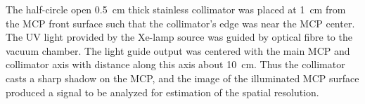 \documentclass[preprint,3p,twocolumn]{elsarticle}
\begin{document}
The half-circle open \SI{.5}{\cm} thick stainless collimator was
placed at \SI{1}{\cm} from the MCP front surface such that the
collimator's edge was near the MCP center.  The UV light provided
by the Xe-lamp source was guided by optical fibre to the
vacuum chamber.  The light guide output was centered with the main
MCP and collimator axis with distance along this axis about
%
%
\SI{10}{\cm}.  Thus the collimator casts a sharp shadow on the
MCP, and the image of the illuminated MCP surface produced a
signal to be analyzed for estimation of the spatial resolution.
\end{document}
